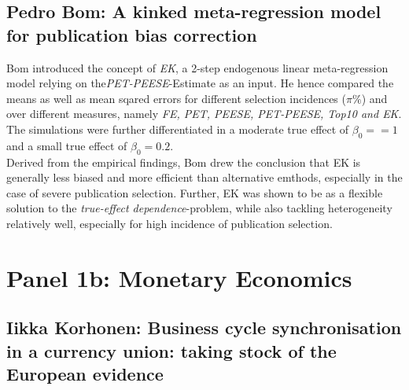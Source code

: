 \documentclass[a4paper,man,natbib]{apa6}
\begin{document}
\subsection{Pedro Bom: A kinked meta-regression model for publication bias correction}
Bom introduced the concept of \textit{EK}, a 2-step endogenous linear meta-regression model relying on the\textit{PET-PEESE}-Estimate as an input. He hence compared the means as well as mean sqared errors for different selection incidences ($\pi\%$) and over different measures, namely \textit{FE, PET, PEESE, PET-PEESE, Top10 and EK}. The simulations were further differentiated in a moderate true effect of $\beta_0 == 1$ and a small true effect of $\beta_0 = 0.2$.\\
Derived from the empirical findings, Bom drew the conclusion that EK is generally less biased and more efficient than alternative emthods, especially in the case of severe publication selection. Further, EK was shown to be as a flexible solution to the \textit{true-effect dependence}-problem, while also tackling heterogeneity relatively well, especially for high incidence of publication selection.\\
\section{Panel 1b: Monetary Economics}

\subsection{Iikka Korhonen: Business cycle synchronisation in a currency union: taking stock of the European evidence}
\end{document}
